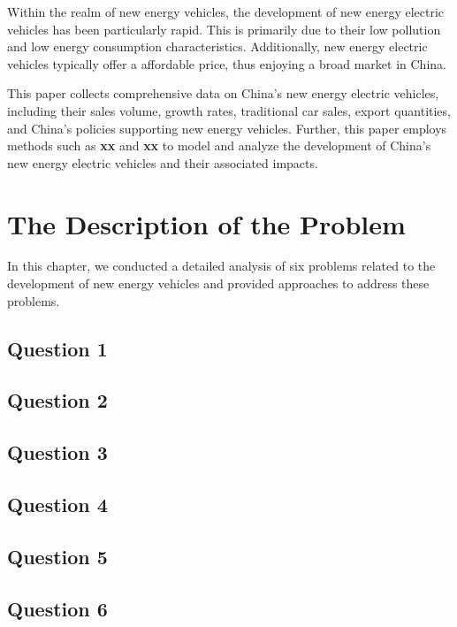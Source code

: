 \documentclass{apmcmthesis}
\begin{document}
Within the realm of new energy vehicles, the development of new energy electric vehicles has been particularly rapid. This is primarily due to their low pollution and low energy consumption characteristics. Additionally, new energy electric vehicles typically offer a affordable price, thus enjoying a broad market in China.

This paper collects comprehensive data on China's new energy electric vehicles, including their sales volume, growth rates, traditional car sales, export quantities, and China's policies supporting new energy vehicles. Further, this paper employs methods such as \textbf{xx} and \textbf{xx} to model and analyze the development of China's new energy electric vehicles and their associated impacts.


\section{The Description of the Problem}

In this chapter, we conducted a detailed analysis of six problems related to the development of new energy vehicles and provided approaches to address these problems.

\subsection{Question 1}



\subsection{Question 2}



\subsection{Question 3}



\subsection{Question 4}



\subsection{Question 5}



\subsection{Question 6}
\end{document}
